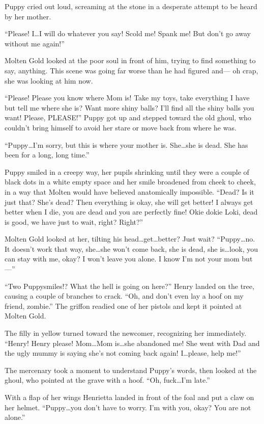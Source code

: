 Puppy cried out loud, screaming at the stone in a desperate attempt to be heard by her mother.

``Please! I\dots I will do whatever you say! Scold me! Spank me! But don't go away without me again!''

Molten Gold looked at the poor soul in front of him, trying to find something to say, anything. This scene was going far worse than he had figured and--- oh crap, she was looking at him now.

``Please! Please you know where Mom is! Take my toys, take everything I have but tell me where she is? Want more shiny balls? I'll find all the shiny balls you want! Please, PLEASE!'' Puppy got up and stepped toward the old ghoul, who couldn't bring himself to avoid her stare or move back from where he was.

``Puppy\dots I'm sorry, but this is where your mother is. She\dots she is dead. She has been for a long, long time.''

Puppy smiled in a creepy way, her pupils shrinking until they were a couple of black dots in a white empty space and her smile broadened from cheek to cheek, in a way that Molten would have believed anatomically impossible. ``Dead? Is it just that? She's dead? Then everything is okay, she will get better! I always get better when I die, you are dead and you are perfectly fine! Okie dokie Loki, dead is good, we have just to wait, right? Right?''

Molten Gold looked at her, tilting his head\dots get\dots better? Just wait? ``Puppy\dots no. It doesn't work that way, she\dots she won't come back, she is dead, she is\dots look, you can stay with me, okay? I won't leave you alone. I know I'm not your mom but---''

``Two Puppysmiles!? What the hell is going on here?'' Henry landed on the tree, causing a couple of branches to crack. ``Oh, and don't even lay a hoof on my friend, zombie.'' The griffon readied one of her pistols and kept it pointed at Molten Gold.

The filly in yellow turned toward the newcomer, recognizing her immediately. ``Henry! Henry please! Mom\dots Mom is\dots she abandoned me! She went with Dad and the ugly mummy is saying she's not coming back again! I\dots please, help me!''

The mercenary took a moment to understand Puppy's words, then looked at the ghoul, who pointed at the grave with a hoof. ``Oh, fuck\dots I'm late.''

With a flap of her wings Henrietta landed in front of the foal and put a claw on her helmet. ``Puppy\dots you don't have to worry. I'm with you, okay? You are not alone.''

